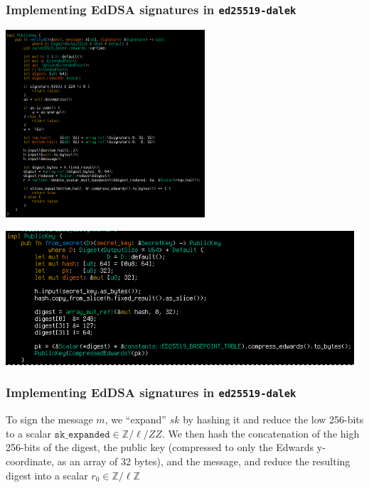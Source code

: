\documentclass[xetex,aspectratio=169]{beamer}
\newcommand{\ZZ}{\mathbb{Z}}
\begin{document}
 \begin{frame}
   \frametitle{Implementing EdDSA signatures in \texttt{ed25519-dalek}}
 
   \begin{center}
     \includegraphics[height=7cm]{verification.png}
   \end{center}
 \end{frame}

 \begin{frame}
    \begin{center}
      \includegraphics[height=5cm]{keygen-public.png}
    \end{center}
  \end{frame}

  \begin{frame}
    \frametitle{Implementing EdDSA signatures in \texttt{ed25519-dalek}}

    To sign the message $m$, we ``expand'' $sk$ by hashing it and
    reduce the low 256-bits to a scalar
    $\texttt{sk\_expanded} \in \ZZ / \ell/ZZ$.  We then hash the concatenation
    of the high 256-bits of the digest, the public key (compressed to only the Edwards
    y-coordinate, as an array of 32 bytes), and the message, and
    reduce the resulting digest into a scalar $r_0 \in \ZZ/\ell\ZZ$

  \end{frame}
\end{document}
